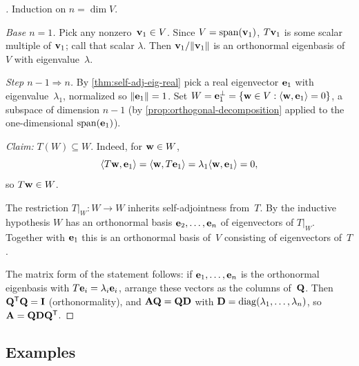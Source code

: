 \begin{proof}[]
Induction on $n = \dim V$.

\emph{Base $n = 1$.} Pick any nonzero~$\mathbf{v}_1 \in V$. Since
$V = \operatorname{span}(\mathbf{v}_1)$, $T\mathbf{v}_1$ is some scalar multiple of
$\mathbf{v}_1$; call that scalar $\lambda$. Then
$\mathbf{v}_1 / \|\mathbf{v}_1\|$ is an orthonormal eigenbasis of~$V$ with
eigenvalue~$\lambda$.

\emph{Step $n - 1 \Rightarrow n$.} By
\cref{thm:self-adj-eig-real} pick a real eigenvector $\mathbf{e}_1$
with eigenvalue~$\lambda_1$, normalized so $\|\mathbf{e}_1\| = 1$. Set
$W = \mathbf{e}_1^{\perp} = \{\mathbf{w} \in V : \langle \mathbf{w}, \mathbf{e}_1 \rangle = 0\}$,
a subspace of dimension $n - 1$ (by
\cref{prop:orthogonal-decomposition} applied to the one-dimensional
$\operatorname{span}(\mathbf{e}_1)$).

\emph{Claim:} $T(W) \subseteq W$. Indeed, for $\mathbf{w} \in W$,
\[
  \langle T\mathbf{w}, \mathbf{e}_1 \rangle
  = \langle \mathbf{w}, T\mathbf{e}_1 \rangle
  = \lambda_1 \langle \mathbf{w}, \mathbf{e}_1 \rangle = 0,
\]
so $T\mathbf{w} \in W$.

The restriction $T|_W \colon W \to W$ inherits self-adjointness from~$T$.
By the inductive hypothesis $W$ has an orthonormal basis
$\mathbf{e}_2, \dots, \mathbf{e}_n$ of eigenvectors of $T|_W$. Together
with $\mathbf{e}_1$ this is an orthonormal basis of~$V$ consisting of
eigenvectors of~$T$.

The matrix form of the statement follows: if $\mathbf{e}_1, \dots, \mathbf{e}_n$
is the orthonormal eigenbasis with $T\mathbf{e}_i = \lambda_i \mathbf{e}_i$,
arrange these vectors as the columns of~$\mathbf{Q}$. Then
$\mathbf{Q}^{\mathsf{T}} \mathbf{Q} = \mathbf{I}$ (orthonormality), and
$\mathbf{A}\mathbf{Q} = \mathbf{Q}\mathbf{D}$ with
$\mathbf{D} = \operatorname{diag}(\lambda_1, \dots, \lambda_n)$, so
$\mathbf{A} = \mathbf{Q}\mathbf{D}\mathbf{Q}^{\mathsf{T}}$.
\end{proof}

\subsection*{Examples}

